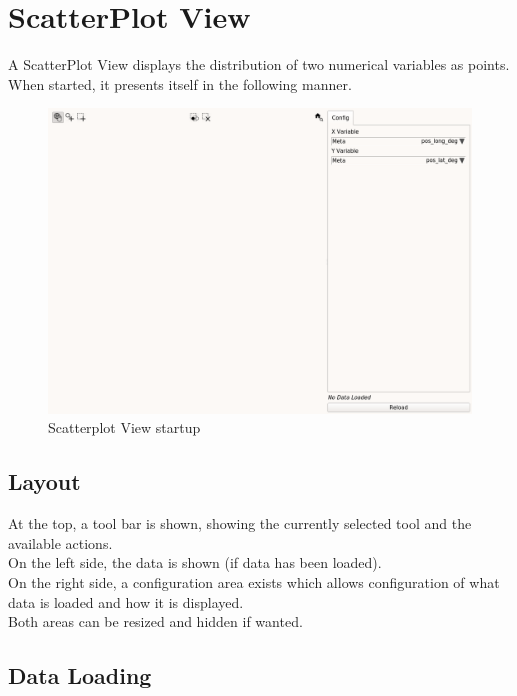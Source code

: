 \chapter{ScatterPlot View}
\label{sec:scatter_view}

A ScatterPlot View displays the distribution of two numerical variables as points. When started, it presents itself in the following manner.

\begin{figure}[H]
    \hspace*{-2cm}
    \includegraphics[width=18cm,frame]{figures/scatter_start.png}
  \caption{Scatterplot View startup}
\end{figure}

\section{Layout}

At the top, a  tool bar is shown, showing the currently selected tool and the available actions. \\

On the left side, the data is shown (if data has been loaded). \\

On the right side, a configuration area exists which allows configuration of what data is loaded and how it is displayed. \\

Both areas can be resized and hidden if wanted.

\section{Data Loading}

